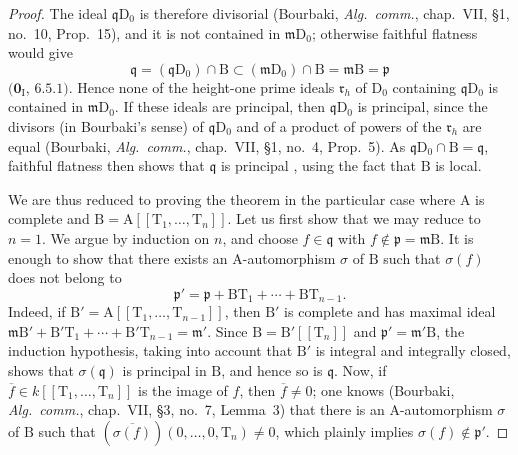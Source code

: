\begin{proof}
The ideal $\mathfrak{q}\mathrm{D}_0$ is therefore divisorial (Bourbaki, \emph{Alg.\ comm.}, chap.~VII, \S1, no.~10, Prop.~15), and it is not contained in $\mathfrak{m}\mathrm{D}_0$; otherwise faithful flatness would give
\[
  \mathfrak{q}=(\mathfrak{q}\mathrm{D}_0)\cap\mathrm{B}
  \subset(\mathfrak{m}\mathrm{D}_0)\cap\mathrm{B}
  =\mathfrak{m}\mathrm{B}=\mathfrak{p}
\]
$(\mathbf{0}_{\mathrm{I}}$, $6.5.1)$. Hence none of the height-one prime ideals $\mathfrak{r}_h$ of $\mathrm{D}_0$ containing $\mathfrak{q}\mathrm{D}_0$ is contained in $\mathfrak{m}\mathrm{D}_0$. If these ideals are principal, then $\mathfrak{q}\mathrm{D}_0$ is principal, since the divisors (in Bourbaki's sense) of $\mathfrak{q}\mathrm{D}_0$ and of a product of powers of the $\mathfrak{r}_h$ are equal (Bourbaki, \emph{Alg.\ comm.}, chap.~VII, \S1, no.~4, Prop.~5). As $\mathfrak{q}\mathrm{D}_0\cap\mathrm{B}=\mathfrak{q}$, faithful flatness then shows that $\mathfrak{q}$ is principal , using the fact that $\mathrm{B}$ is local.

We are thus reduced to proving the theorem in the particular case where $\mathrm{A}$ is complete and $\mathrm{B}=\mathrm{A}[[\mathrm{T}_1,\ldots,\mathrm{T}_n]]$. Let us first show that we may reduce to $n=1$. We argue by induction on $n$, and choose $f\in\mathfrak{q}$ with $f\notin\mathfrak{p}=\mathfrak{m}\mathrm{B}$. It is enough to show that there exists an $\mathrm{A}$-automorphism $\sigma$ of $\mathrm{B}$ such that $\sigma(f)$ does not belong to
\[
  \mathfrak{p}'=\mathfrak{p}+\mathrm{B}\mathrm{T}_1+\cdots+\mathrm{B}\mathrm{T}_{n-1}.
\]
Indeed, if $\mathrm{B}'=\mathrm{A}[[\mathrm{T}_1,\ldots,\mathrm{T}_{n-1}]]$, then $\mathrm{B}'$ is complete and has maximal ideal $\mathfrak{m}\mathrm{B}'+\mathrm{B}'\mathrm{T}_1+\cdots+\mathrm{B}'\mathrm{T}_{n-1}=\mathfrak{m}'$. Since $\mathrm{B}=\mathrm{B}'[[\mathrm{T}_n]]$ and $\mathfrak{p}'=\mathfrak{m}'\mathrm{B}$, the induction hypothesis, taking into account that $\mathrm{B}'$ is integral and integrally closed, shows that $\sigma(\mathfrak{q})$ is principal in $\mathrm{B}$, and hence so is $\mathfrak{q}$. Now, if $\overline{f}\in k[[\mathrm{T}_1,\ldots,\mathrm{T}_n]]$ is the image of $f$, then $\overline{f}\neq0$; one knows (Bourbaki, \emph{Alg.\ comm.}, chap.~VII, \S3, no.~7, Lemma~3) that there is an $\mathrm{A}$-automorphism $\sigma$ of $\mathrm{B}$ such that $(\overline{\sigma(f)})(0,\ldots,0,\mathrm{T}_n)\neq0$, which plainly implies $\sigma(f)\notin\mathfrak{p}'$.


\end{proof}
